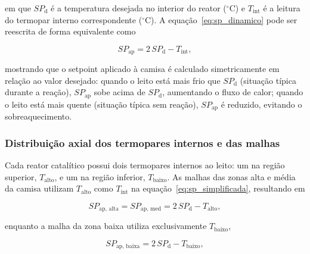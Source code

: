 em que $SP_{\mathrm{d}}$ é a temperatura desejada no interior do reator
(\(^\circ\)C) e $T_{\mathrm{int}}$ é a leitura do termopar interno
correspondente (\(^\circ\)C). A equação~\eqref{eq:sp_dinamico} pode ser
reescrita de forma equivalente como

\begin{equation}
  SP_{\mathrm{ap}} = 2\,SP_{\mathrm{d}} - T_{\mathrm{int}},
  \label{eq:sp_simplificada}
\end{equation}

mostrando que o setpoint aplicado à camisa é calculado simetricamente em
relação ao valor desejado: quando o leito está mais frio que $SP_{\mathrm{d}}$
(situação típica durante a reação), $SP_{\mathrm{ap}}$ sobe acima de
$SP_{\mathrm{d}}$, aumentando o fluxo de calor; quando o leito está mais
quente (situação típica sem reação), $SP_{\mathrm{ap}}$ é reduzido,
evitando o sobreaquecimento.


\subsubsection{Distribuição axial dos termopares internos e das malhas}

Cada reator catalítico possui dois termopares internos ao leito: um na região
superior, $T_{\mathrm{alto}}$, e um na região inferior, $T_{\mathrm{baixo}}$.
As malhas das zonas alta e média da camisa utilizam $T_{\mathrm{alto}}$ como
$T_{\mathrm{int}}$ na equação~\eqref{eq:sp_simplificada}, resultando em

\begin{equation}
  SP_{\mathrm{ap,\,alta}} = SP_{\mathrm{ap,\,med}} =
  2\,SP_{\mathrm{d}} - T_{\mathrm{alto}},
  \label{eq:sp_alto_med}
\end{equation}

enquanto a malha da zona baixa utiliza exclusivamente $T_{\mathrm{baixo}}$,

\begin{equation}
  SP_{\mathrm{ap,\,baixa}} = 2\,SP_{\mathrm{d}} - T_{\mathrm{baixo}},
  \label{eq:sp_baixo}
\end{equation}

